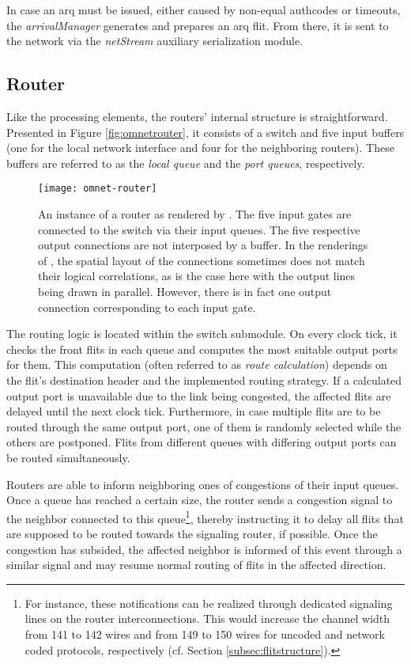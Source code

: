 In case an \gls{arq} must be issued, either caused by non-equal authcodes or timeouts, the \textit{arrivalManager} generates and prepares an
\gls{arq} flit. From there, it is sent to the network via the \textit{netStream} auxiliary serialization module.

\subsection{Router}\label{subsec:routerimpl}
Like the processing elements, the routers' internal structure is straightforward. Presented in Figure \vref{fig:omnetrouter}, it consists of a switch
and five input buffers (one for the local network interface and four for the neighboring routers). These buffers are referred to as the \textit{local
queue} and the \textit{port queues}, respectively.

\begin{figure}
    \centering
    \texttt{[image: omnet-router]}
    \caption[Simulator view of a router]{An instance of a router as rendered by \omnet{}. The five input gates are connected to the switch via their
    input queues. The five respective output connections are not interposed by a buffer. In the renderings of \omnet{}, the spatial layout of the
    connections sometimes does not match their logical correlations, as is the case here with the output lines being drawn in parallel. However, there is
    in fact one output connection corresponding to each input gate.}
    \label{fig:omnetrouter}
\end{figure}

The routing logic is located within the switch submodule. On every clock tick, it checks the front flits in each queue and computes the most suitable
output ports for them. This computation (often referred to as \textit{route calculation}) depends on the flit's destination header and the implemented routing
strategy. If a calculated output port is unavailable due to the link being congested, the affected flits are delayed until the next clock tick.
Furthermore, in case multiple flits are to be routed through the same output port, one of them is randomly selected while the others are postponed.
Flits from different queues with differing output ports can be routed simultaneously.

Routers are able to inform neighboring ones of congestions of their input queues. Once a queue has reached a certain size, the router sends a congestion signal to the
neighbor connected to this queue\footnote{For instance, these notifications can be realized through dedicated signaling lines on the router
interconnections. This would increase the channel width from 141 to 142 wires and from 149 to 150 wires for uncoded and network coded protocols,
respectively (cf. Section \ref{subsec:flitstructure}).}, thereby instructing it to delay all flits that are supposed to be routed towards the
signaling router, if possible. Once the congestion has subsided, the affected neighbor is informed of this event through a similar signal and may
resume normal routing of flits in the affected direction.

